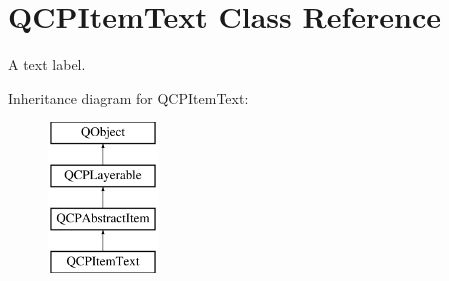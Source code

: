 \hypertarget{classQCPItemText}{\section{Q\-C\-P\-Item\-Text Class Reference}
\label{classQCPItemText}
}


A text label.  


Inheritance diagram for Q\-C\-P\-Item\-Text\-:\begin{figure}[H]
\begin{center}
\leavevmode
\includegraphics[height=4.000000cm]{classQCPItemText}
\end{center}
\end{figure}
